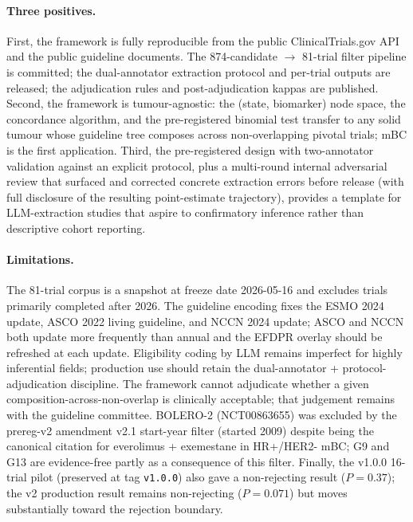 \paragraph{Three positives.}
First, the framework is fully reproducible from the public ClinicalTrials.gov API and the public guideline documents. The 874-candidate $\to$ 81-trial filter pipeline is committed; the dual-annotator extraction protocol and per-trial outputs are released; the adjudication rules and post-adjudication kappas are published. Second, the framework is tumour-agnostic: the (state, biomarker) node space, the concordance algorithm, and the pre-registered binomial test transfer to any solid tumour whose guideline tree composes across non-overlapping pivotal trials; mBC is the first application. Third, the pre-registered design with two-annotator validation against an explicit protocol, plus a multi-round internal adversarial review that surfaced and corrected concrete extraction errors before release (with full disclosure of the resulting point-estimate trajectory), provides a template for LLM-extraction studies that aspire to confirmatory inference rather than descriptive cohort reporting.

\paragraph{Limitations.}
The 81-trial corpus is a snapshot at freeze date 2026-05-16 and excludes trials primarily completed after 2026. The guideline encoding fixes the ESMO 2024 update, ASCO 2022 living guideline, and NCCN 2024 update; ASCO and NCCN both update more frequently than annual and the EFDPR overlay should be refreshed at each update. Eligibility coding by LLM remains imperfect for highly inferential fields; production use should retain the dual-annotator + protocol-adjudication discipline. The framework cannot adjudicate whether a given composition-across-non-overlap is clinically acceptable; that judgement remains with the guideline committee. BOLERO-2 (NCT00863655) was excluded by the prereg-v2 amendment v2.1 start-year filter (started 2009) despite being the canonical citation for everolimus + exemestane in HR+/HER2- mBC; G9 and G13 are evidence-free partly as a consequence of this filter. Finally, the v1.0.0 16-trial pilot (preserved at tag \texttt{v1.0.0}) also gave a non-rejecting result ($P = 0.37$); the v2 production result remains non-rejecting ($P = 0.071$) but moves substantially toward the rejection boundary.

